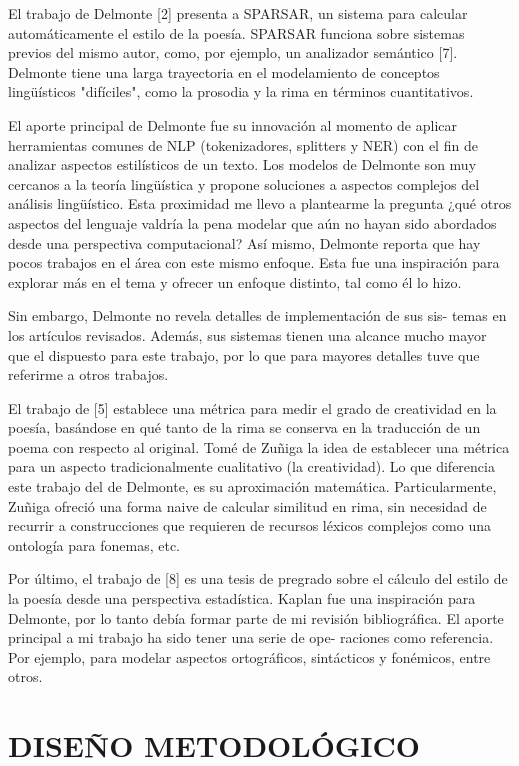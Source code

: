 \documentclass[twoside]{article}
\begin{document}
El trabajo de Delmonte [2] presenta a SPARSAR, un sistema para calcular
automáticamente el estilo de la poesía. SPARSAR funciona sobre sistemas
previos del mismo autor, como, por ejemplo, un analizador semántico [7].
Delmonte tiene una larga trayectoria en el modelamiento de conceptos
lingüísticos "difíciles", como la prosodia y la rima en términos
cuantitativos.

El aporte principal de Delmonte fue su innovación al momento de aplicar
herramientas comunes de NLP (tokenizadores, splitters y NER) con el fin
de analizar aspectos estilísticos de un texto. Los modelos de Delmonte
son muy cercanos a la teoría lingüística y propone soluciones a aspectos
complejos del análisis lingüístico. Esta proximidad me llevo a
plantearme la pregunta ¿qué otros aspectos del lenguaje valdría la pena
modelar que aún no hayan sido abordados desde una perspectiva
computacional? Así mismo, Delmonte reporta que hay pocos trabajos en el
área con este mismo enfoque. Esta fue una inspiración para explorar más
en el tema y ofrecer un enfoque distinto, tal como él lo hizo.

Sin embargo, Delmonte no revela detalles de implementación de sus sis-
temas en los artículos revisados. Además, sus sistemas tienen una
alcance mucho mayor que el dispuesto para este trabajo, por lo que para
mayores detalles tuve que referirme a otros trabajos.

El trabajo de [5] establece una métrica para medir el grado de
creatividad en la poesía, basándose en qué tanto de la rima se conserva
en la traducción de un poema con respecto al original. Tomé de Zuñiga la
idea de establecer una métrica para un aspecto tradicionalmente
cualitativo (la creatividad). Lo que diferencia este trabajo del de
Delmonte, es su aproximación matemática. Particularmente, Zuñiga ofreció
una forma naive de calcular similitud en rima, sin necesidad de recurrir
a construcciones que requieren de recursos léxicos complejos como una
ontología para fonemas, etc.

Por último, el trabajo de [8] es una tesis de pregrado sobre el cálculo
del estilo de la poesía desde una perspectiva estadística. Kaplan fue
una inspiración para Delmonte, por lo tanto debía formar parte de mi
revisión bibliográfica. El aporte principal a mi trabajo ha sido tener
una serie de ope- raciones como referencia. Por ejemplo, para modelar
aspectos ortográficos, sintácticos y fonémicos, entre otros.

\section{DISEÑO METODOLÓGICO}
\label{sec:org243191d}
\end{document}
